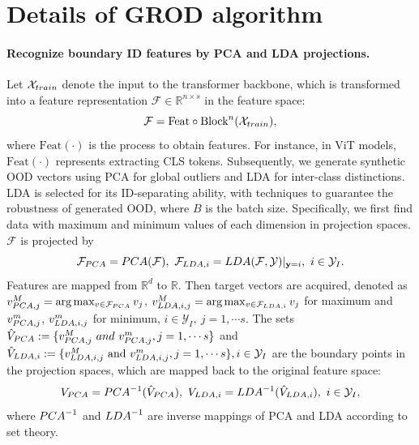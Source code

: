 \documentclass{article}
\theoremstyle{plain}
\theoremstyle{definition}
\theoremstyle{remark}
\begin{document}
\section{Details of \textsc{GROD} algorithm}\label{grod method}

\paragraph{Recognize boundary ID features by PCA and LDA projections.}

Let $\mathcal{X}_{\rm train}$ denote the input to the transformer backbone, which is transformed into a feature representation $\mathcal{F} \in \mathbb{R}^{n \times s}$ in the feature space:
\begin{equation}
    \mathcal{F} = \text{Feat}\circ \text{Block}^n(\mathcal{X}_{\rm train}),
    \label{eq: 19}
\end{equation}
where $\text{Feat}(\cdot)$ is the process to obtain features. For instance, in ViT models, $\text{Feat}(\cdot)$ represents extracting CLS tokens.
%
Subsequently, we generate synthetic OOD vectors using PCA for global outliers and LDA for inter-class distinctions. LDA is selected for its ID-separating ability, with techniques to guarantee the robustness of generated OOD, where $B$ is the batch size. 
%
Specifically, we first find data with maximum and minimum values of each dimension in projection spaces. $\mathcal{F}$ is projected by
\begin{equation}
        \mathcal{F}_{{\rm PCA}} = {\rm PCA}(\mathcal{F}),~
        \mathcal{F}_{{\rm LDA}, i} = {\rm LDA}(\mathcal{F}, \mathcal{Y})|_{\mathbf{y}=i},~ i \in \mathcal{Y}_I.
    \label{eq: 20}
\end{equation}
Features are mapped from $\mathbb{R}^d$ to $\mathbb{R}$. 
%
Then target vectors are acquired, denoted as $v^M_{{\rm PCA},j} = \arg\max_{v\in \mathcal{F}_{\rm PCA}}v_j$, $v^M_{{\rm LDA},i,j} =\arg\max_{v\in \mathcal{F}_{{\rm LDA},i}}v_j$ for maximum and $v^m_{{\rm PCA},j}$, $v^m_{{\rm LDA},i,j}$ for minimum, $i \in \mathcal{Y}_I,~j = 1,\cdots s$.
%
The sets $\hat{V}_{\rm PCA}:=\{v^M_{{\rm PCA},j}~and~ v^m_{{\rm PCA},j}, j = 1,\cdots s\}$ and $\hat{V}_{{\rm LDA}, i}:= \{v^M_{{\rm LDA},i,j}~\text{and}~v^m_{{\rm LDA},i,j}, j = 1,\cdots s\}, i \in \mathcal{Y}_I$ are the boundary points in the projection spaces, which are mapped back to the original feature space:
\begin{equation}
    V_{\rm PCA} = {\rm PCA}^{-1}(\hat{V}_{{\rm PCA}}),~
    V_{{\rm LDA}, i} = {\rm LDA}^{-1}(\hat{V}_{{\rm LDA}, i}),~i \in \mathcal{Y}_I,
\label{eq: edge}
\end{equation}
where ${\rm PCA}^{-1}$ and ${\rm LDA}^{-1}$ are inverse mappings of PCA and LDA according to set theory.
%
\end{document}
